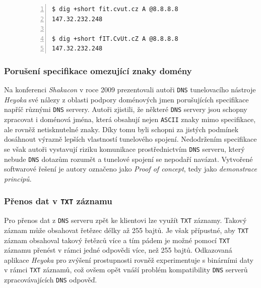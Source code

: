 \documentclass[thesis=M,czech]{FITthesis}[2012/10/20]
\begin{document}
    
    \begin{figure}[h]
	\begin{lstlisting}[caption=Demonstrace ignorování velikosti písmen v doménových jménech,frame=single,numbers=left]
$ dig +short fit.cvut.cz A @8.8.8.8
147.32.232.248

$ dig +short fIT.CvUt.cZ A @8.8.8.8
147.32.232.248
      \end{lstlisting}
      \label{code:dns-case-insensitive}
    \end{figure}

    
    
    \subsubsection{Porušení specifikace omezující znaky domény}
    
    Na konferenci \textit{Shakacon}\cite{shakacon-heyoka} v roce 2009 prezentovali autoři \texttt{DNS} tunelovacího nástroje \textit{Heyoka} své nálezy z oblasti podpory doménových jmen porušujících specifikace napříč různými \texttt{DNS} servery. Autoři zjistili, že některé \texttt{DNS} servery jsou schopny zpracovat i doménová jména, která obsahují nejen \texttt{ASCII} znaky mimo specifikace, ale rovněž netisknutelné znaky. Díky tomu byli schopni za jistých podmínek dosáhnout výrazně lepších vlastností tunelového spojení. Nedodržením specifikace se však autoři vystavují riziku komunikace prostřednictvím \texttt{DNS} serveru, který nebude \texttt{DNS} dotazům rozumět a tunelové spojení se nepodaří navázat. Vytvořené softwarové řešení je autory označeno jako \textit{Proof of concept}, tedy jako \textit{demonstrace principů}.
    
    \subsubsection{Přenos dat v \texttt{TXT} záznamu}
    
    Pro přenos dat z \texttt{DNS} serveru zpět ke klientovi lze využít \texttt{TXT} záznamy. Takový záznam může obsahovat řetězec délky až 255 bajtů. Je však přípustné, aby \texttt{TXT} záznam obsahoval takový řetězců více a tím pádem je možné pomocí \texttt{TXT} záznamu přenést v rámci jedné odpovědi více, než 255 bajtů. Odkazovaná aplikace \textit{Heyoka}\cite{shakacon-heyoka} pro zvýšení prostupnosti rovněž experimentuje s binárními daty v rámci \texttt{TXT} záznamů, což ovšem opět vnáší problém kompatibility \texttt{DNS} serverů zpracovávajících \texttt{DNS} odpověď.
    
\end{document}
